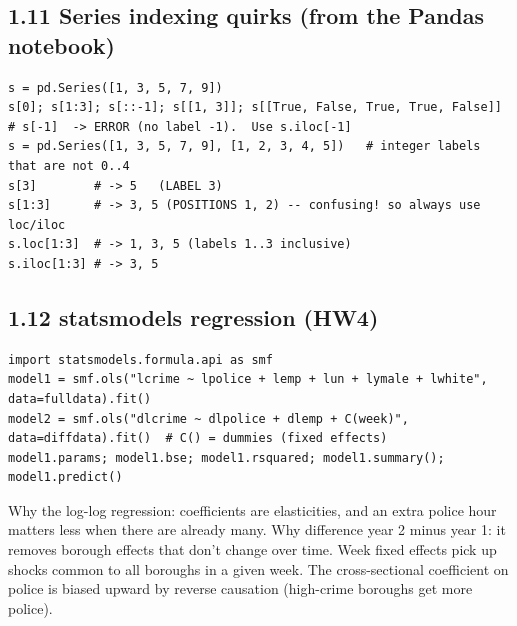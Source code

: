 \documentclass[10pt]{article}
\begin{document}
\subsection*{1.11 Series indexing quirks (from the Pandas notebook)}
\begin{lstlisting}
s = pd.Series([1, 3, 5, 7, 9])
s[0]; s[1:3]; s[::-1]; s[[1, 3]]; s[[True, False, True, True, False]]
# s[-1]  -> ERROR (no label -1).  Use s.iloc[-1]
s = pd.Series([1, 3, 5, 7, 9], [1, 2, 3, 4, 5])   # integer labels that are not 0..4
s[3]        # -> 5   (LABEL 3)
s[1:3]      # -> 3, 5 (POSITIONS 1, 2) -- confusing! so always use loc/iloc
s.loc[1:3]  # -> 1, 3, 5 (labels 1..3 inclusive)
s.iloc[1:3] # -> 3, 5
\end{lstlisting}

\subsection*{1.12 statsmodels regression (HW4)}
\begin{lstlisting}
import statsmodels.formula.api as smf
model1 = smf.ols("lcrime ~ lpolice + lemp + lun + lymale + lwhite", data=fulldata).fit()
model2 = smf.ols("dlcrime ~ dlpolice + dlemp + C(week)", data=diffdata).fit()  # C() = dummies (fixed effects)
model1.params; model1.bse; model1.rsquared; model1.summary(); model1.predict()
\end{lstlisting}
Why the log-log regression: coefficients are elasticities, and an extra police hour matters less when there are already many. Why difference year 2 minus year 1: it removes borough effects that don't change over time. Week fixed effects pick up shocks common to all boroughs in a given week. The cross-sectional coefficient on police is biased upward by reverse causation (high-crime boroughs get more police).

\end{document}
